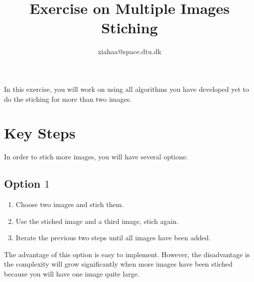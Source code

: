 \documentclass[a4paper]{article}
\begin{document}
\title{Exercise on Multiple Images Stiching}
\author{xiahaa@space.dtu.dk}
\maketitle%

In this exercise, you will work on using all algorithms you have developed yet to do the stiching for more than two images.

\section{Key Steps}
In order to stich more images, you will have several options:
\subsection{Option $1$}
\begin{enumerate}
\item Choose two images and stich them.
\item Use the stiched image and a third image, stich again.
\item Iterate the previous two steps until all images have been added.
\end{enumerate}
The advantage of this option is easy to implement. However, the disadvantage is the complexity will grow significantly when more images have been stiched because you will have one image quite large.
\end{document}
